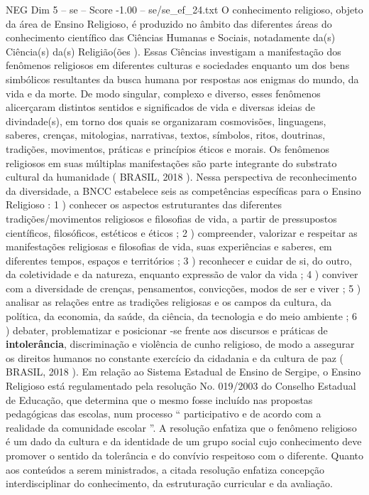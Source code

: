 \begin{textsample}{NEG Dim 5 – se – Score -1.00 – se/se\_ef\_24.txt}
O conhecimento religioso, objeto da área de Ensino Religioso, é produzido no âmbito das diferentes áreas do conhecimento científico das Ciências Humanas e Sociais, notadamente da(s) Ciência(s) da(s) Religião(ões ).
Essas Ciências investigam a manifestação dos fenômenos religiosos em diferentes culturas e sociedades enquanto um dos bens simbólicos resultantes da busca humana por respostas aos enigmas do mundo, da vida e da morte.
De modo singular, complexo e diverso, esses fenômenos alicerçaram distintos sentidos e significados de vida e diversas ideias de divindade(s), em torno dos quais se organizaram cosmovisões, linguagens, saberes, crenças, mitologias, narrativas, textos, símbolos, ritos, doutrinas, tradições, movimentos, práticas e princípios éticos e morais.
Os fenômenos religiosos em suas múltiplas manifestações são parte integrante do substrato cultural da humanidade ( BRASIL, 2018 ).
Nessa perspectiva de reconhecimento da diversidade, a BNCC estabelece seis as competências específicas para o Ensino Religioso : 1 ) conhecer os aspectos estruturantes das diferentes tradições/movimentos religiosos e filosofias de vida, a partir de pressupostos científicos, filosóficos, estéticos e éticos ; 2 ) compreender, valorizar e respeitar as manifestações religiosas e filosofias de vida, suas experiências e saberes, em diferentes tempos, espaços e territórios ; 3 ) reconhecer e cuidar de si, do outro, da coletividade e da natureza, enquanto expressão de valor da vida ; 4 ) conviver com a diversidade de crenças, pensamentos, convicções, modos de ser e viver ; 5 ) analisar as relações entre as tradições religiosas e os campos da cultura, da política, da economia, da saúde, da ciência, da tecnologia e do meio ambiente ; 6 ) debater, problematizar e posicionar -se frente aos discursos e práticas de \textbf{intolerância}, discriminação e violência de cunho religioso, de modo a assegurar os direitos humanos no constante exercício da cidadania e da cultura de paz ( BRASIL, 2018 ).
Em relação ao Sistema Estadual de Ensino de Sergipe, o Ensino Religioso está regulamentado pela resolução No. 019/2003 do Conselho Estadual de Educação, que determina que o mesmo fosse incluído nas propostas pedagógicas das escolas, num processo “ participativo e de acordo com a realidade da comunidade escolar ”.
A resolução enfatiza que o fenômeno religioso é um dado da cultura e da identidade de um grupo social cujo conhecimento deve promover o sentido da tolerância e do convívio respeitoso com o diferente.
Quanto aos conteúdos a serem ministrados, a citada resolução enfatiza concepção interdisciplinar do conhecimento, da estruturação curricular e da avaliação.

\end{textsample}
